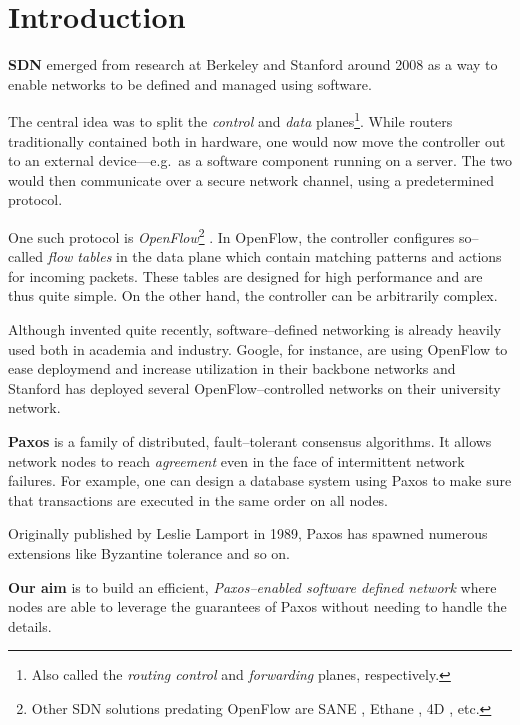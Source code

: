\chapter{Introduction}

\textbf{\acf{SDN}} \cite{Casado:2005:VNS:1047344.1047383} emerged from
research at Berkeley and Stanford around 2008 as a way to enable networks to
be defined and managed using software.

The central idea was to split the {\em control} and {\em data}
planes\footnote{Also called the {\em routing control} and {\em forwarding}
planes, respectively.}.
%
While routers traditionally contained both in hardware, one would now move
the controller out to an external device---e.g.~as a software component
running on a server.  The two would then communicate over a secure network
channel, using a predetermined protocol.

One such protocol is {\em OpenFlow}\footnote{Other
\ac{SDN} solutions predating OpenFlow are SANE
\cite{Casado:2006:SPA:1267336.1267346}, Ethane
\cite{Casado:2007:ETC:1282427.1282382}, 4D
\cite{Greenberg:2005:CSA:1096536.1096541}, etc.}
\cite{McKeown:2008:OEI:1355734.1355746}. 
In OpenFlow, the controller configures so--called {\em flow tables} in the
data plane  which contain matching patterns and actions
for incoming packets.  These tables are designed for high performance
and are thus quite simple.  On the other hand, the controller can be
arbitrarily complex.

Although invented quite recently, software--defined networking is already
heavily used both in academia and industry.  Google, for instance, are using
OpenFlow to ease deploymend and increase utilization in their backbone
networks \cite{crabbe2012sdn} and Stanford has deployed several
OpenFlow--controlled networks on their university network.

\textbf{Paxos} \cite{Lamport:1998:PP:279227.279229} is a
family of distributed, fault--tolerant consensus algorithms.  It allows
network nodes to reach {\em agreement} even in the face of intermittent
network failures.  For example, one can design a database system using Paxos
to make sure that transactions are executed in the same order on all nodes.

Originally published by Leslie Lamport in 1989, Paxos
has spawned numerous extensions like Byzantine tolerance and so on.

\textbf{Our aim} is to build an efficient, {\em Paxos--enabled software defined
network} where nodes are able to leverage the guarantees of Paxos without
needing to handle the details.

